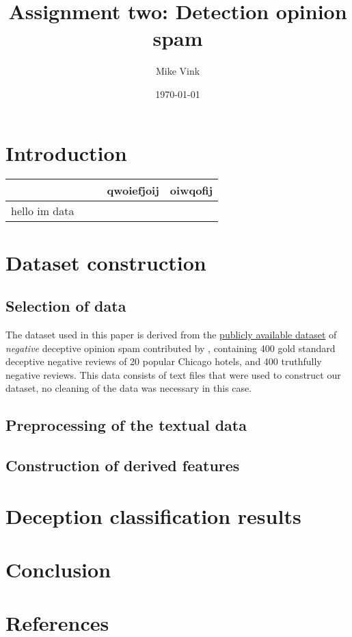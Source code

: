 \documentclass[11pt]{article}
\author{Mike Vink}
\date{\today}
\title{Assignment two: Detection opinion spam}
\begin{document}
\maketitle
\tableofcontents



\section{Introduction}
\label{sec:orgaec8a4b}

\begin{center}
\begin{tabular}{lllll}
\toprule
 &  &  & qwoiefjoij & oiwqofij\\
\midrule
hello im data &  &  &  & \\
\bottomrule
\end{tabular}
\end{center}
\section{Dataset construction}
\label{sec:org3b31006}

\subsection{Selection of data}
\label{sec:org4385126}

The dataset used in this paper is derived from the \href{https://myleott.com/op-spam.html }{publicly available dataset} of
\emph{negative} deceptive opinion spam contributed by \cite{ott2013negative}, containing
400 gold standard deceptive negative reviews of 20 popular Chicago hotels, and
400 truthfully negative reviews. This data consists of text files that were used
to construct our dataset, no cleaning of the data was necessary in this case.  

\subsection{Preprocessing of the textual data}
\label{sec:org0bb6935}

\subsection{Construction of derived features}
\label{sec:org4a7f6a4}

\section{}
\label{sec:orge88a914}

\section{Deception classification results}
\label{sec:orgbb4f498}
\section{Conclusion}
\label{sec:org44818c1}

\section{References}
\label{sec:org0381bfb}


\end{document}
